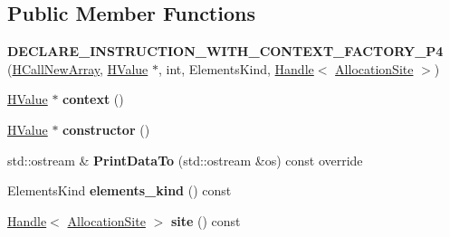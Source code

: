 \subsection*{Public Member Functions}
\begin{DoxyCompactItemize}
\item 
{\bfseries D\+E\+C\+L\+A\+R\+E\+\_\+\+I\+N\+S\+T\+R\+U\+C\+T\+I\+O\+N\+\_\+\+W\+I\+T\+H\+\_\+\+C\+O\+N\+T\+E\+X\+T\+\_\+\+F\+A\+C\+T\+O\+R\+Y\+\_\+\+P4} (\hyperlink{classv8_1_1internal_1_1_h_call_new_array}{H\+Call\+New\+Array}, \hyperlink{classv8_1_1internal_1_1_h_value}{H\+Value} $\ast$, int, Elements\+Kind, \hyperlink{classv8_1_1internal_1_1_handle}{Handle}$<$ \hyperlink{classv8_1_1internal_1_1_allocation_site}{Allocation\+Site} $>$)\hypertarget{classv8_1_1internal_1_1_h_call_new_array_aae7387a77a3ce48fe90bb6d2d8b20cd1}{}\label{classv8_1_1internal_1_1_h_call_new_array_aae7387a77a3ce48fe90bb6d2d8b20cd1}

\item 
\hyperlink{classv8_1_1internal_1_1_h_value}{H\+Value} $\ast$ {\bfseries context} ()\hypertarget{classv8_1_1internal_1_1_h_call_new_array_aab7c55771ab3caa29f29c4b92a4aa817}{}\label{classv8_1_1internal_1_1_h_call_new_array_aab7c55771ab3caa29f29c4b92a4aa817}

\item 
\hyperlink{classv8_1_1internal_1_1_h_value}{H\+Value} $\ast$ {\bfseries constructor} ()\hypertarget{classv8_1_1internal_1_1_h_call_new_array_af8f357ea18cff5a95dd319b76afe2265}{}\label{classv8_1_1internal_1_1_h_call_new_array_af8f357ea18cff5a95dd319b76afe2265}

\item 
std\+::ostream \& {\bfseries Print\+Data\+To} (std\+::ostream \&os) const  override\hypertarget{classv8_1_1internal_1_1_h_call_new_array_ac541d60168aba7c7fe38a3c1d4e53d72}{}\label{classv8_1_1internal_1_1_h_call_new_array_ac541d60168aba7c7fe38a3c1d4e53d72}

\item 
Elements\+Kind {\bfseries elements\+\_\+kind} () const \hypertarget{classv8_1_1internal_1_1_h_call_new_array_aea4834cdf85cef3c62c8ec6b8f924952}{}\label{classv8_1_1internal_1_1_h_call_new_array_aea4834cdf85cef3c62c8ec6b8f924952}

\item 
\hyperlink{classv8_1_1internal_1_1_handle}{Handle}$<$ \hyperlink{classv8_1_1internal_1_1_allocation_site}{Allocation\+Site} $>$ {\bfseries site} () const \hypertarget{classv8_1_1internal_1_1_h_call_new_array_a1082ebde46afe32e7d7751a697343b72}{}\label{classv8_1_1internal_1_1_h_call_new_array_a1082ebde46afe32e7d7751a697343b72}

\end{DoxyCompactItemize}
